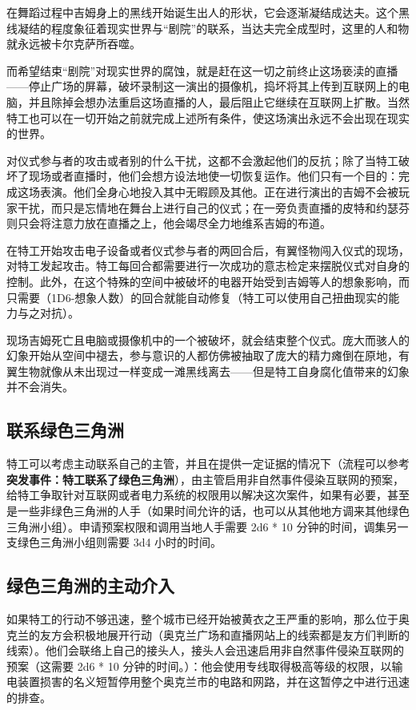 在舞蹈过程中吉姆身上的黑线开始诞生出人的形状，它会逐渐凝结成达夫。这个黑线凝结的程度象征着现实世界与“剧院”的联系，当达夫完全成型时，这里的人和物就永远被卡尔克萨所吞噬。

而希望结束“剧院”对现实世界的腐蚀，就是赶在这一切之前终止这场亵渎的直播——停止广场的屏幕，破坏录制这一演出的摄像机，捣坏将其上传到互联网上的电脑，并且除掉会想办法重启这场直播的人，最后阻止它继续在互联网上扩散。当然特工也可以在一切开始之前就完成上述所有条件，使这场演出永远不会出现在现实的世界。

对仪式参与者的攻击或者别的什么干扰，这都不会激起他们的反抗；除了当特工破坏了现场或者直播时，他们会想方设法地使一切恢复运作。他们只有一个目的：完成这场表演。他们全身心地投入其中无暇顾及其他。正在进行演出的吉姆不会被玩家干扰，而只是忘情地在舞台上进行自己的仪式；在一旁负责直播的皮特和约瑟芬则只会将注意力放在直播之上，他会竭尽全力地维系吉姆的布道。

在特工开始攻击电子设备或者仪式参与者的两回合后，有翼怪物闯入仪式的现场，对特工发起攻击。特工每回合都需要进行一次成功的意志检定来摆脱仪式对自身的控制。此外，在这个特殊的空间中被破坏的电器开始受到吉姆等人的想象影响，而只需要（1D6-想象人数）的回合就能自动修复（特工可以使用自己扭曲现实的能力与之对抗）。

现场吉姆死亡且电脑或摄像机中的一个被破坏，就会结束整个仪式。庞大而骇人的幻象开始从空间中褪去，参与意识的人都仿佛被抽取了庞大的精力瘫倒在原地，有翼生物就像从未出现过一样变成一滩黑线离去——但是特工自身腐化值带来的幻象并不会消失。

\subsection{联系绿色三角洲}

特工可以考虑主动联系自己的主管，并且在提供一定证据的情况下（流程可以参考\textbf{突发事件：特工联系了绿色三角洲}），由主管启用非自然事件侵染互联网的预案，给特工争取针对互联网或者电力系统的权限用以解决这次案件，如果有必要，甚至是一些非绿色三角洲的人手（如果时间允许的话，也可以从其他地方调来其他绿色三角洲小组）。申请预案权限和调用当地人手需要 2d6 * 10 分钟的时间，调集另一支绿色三角洲小组则需要 3d4 小时的时间。

\subsection{绿色三角洲的主动介入}

如果特工的行动不够迅速，整个城市已经开始被黄衣之王严重的影响，那么位于奥克兰的友方会积极地展开行动（奥克兰广场和直播网站上的线索都是友方们判断的线索）。他们会联络上自己的接头人，接头人会迅速启用非自然事件侵染互联网的预案（这需要 2d6 * 10 分钟的时间。）：他会使用专线取得极高等级的权限，以输电装置损害的名义短暂停用整个奥克兰市的电路和网路，并在这暂停之中进行迅速的排查。


